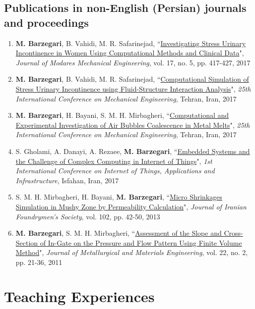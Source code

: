 \documentclass{cv}
\begin{document}
\subsection{Publications in non-English (Persian) journals and proceedings}
\begin{enumerate}
\item
\textbf{M. Barzegari}, B. Vahidi, M. R. Safarinejad, ``\href{http://mme-old.modares.ac.ir/article_16771_en.html}{Investigating Stress Urinary Incontinence in Women Using Computational Methods and Clinical Data}", \textit{Journal of Modares Mechanical Engineering}, vol. 17, no. 5, pp. 417-427, 2017 %
\item
\textbf{M. Barzegari}, B. Vahidi, M. R. Safarinejad, ``\href{https://www.civilica.com/Paper-ISME25-ISME25_342.html}{Computational Simulation of Stress Urinary Incontinence using Fluid-Structure Interaction Analysis}", \textit{25th International Conference on Mechanical Engineering}, Tehran, Iran, 2017
\item
\textbf{M. Barzegari}, H. Bayani, S. M. H. Mirbagheri, ``\href{https://www.civilica.com/Paper-ISME25-ISME25_710.html}{Computational and Experimental Investigation of Air Bubbles Coalescence in Metal Melts}", \textit{25th International Conference on Mechanical Engineering}, Tehran, Iran, 2017
\item
S. Gholami, A. Danayi, A. Rezaee, \textbf{M. Barzegari}, ``\href{https://civilica.com/doc/656407/}{Embedded Systems and the Challenge of Complex Computing in Internet of Things}", \textit{1st International Conference on Internet of Things, Applications and Infrastructure}, Isfahan, Iran, 2017
\item
S. M. H. Mirbagheri, H. Bayani, \textbf{M. Barzegari}, ``\href{https://1drv.ms/b/s!Av7P45pSaDtYgUnsN3LHLbiNHomt}{Micro Shrinkages Simulation in Mushy Zone by Permeability Calculation}", \textit{Journal of Iranian Foundrymen's Society}, vol. 102, pp. 42-50, 2013 %
\item
\textbf{M. Barzegari}, S. M. H. Mirbagheri, ``\href{http://jmme.um.ac.ir/index.php/metallurgical/article/view/10905}{Assessment of the Slope and Cross-Section of In-Gate on the Pressure and Flow Pattern Using Finite Volume Method}", \textit{Journal of Metallurgical and Materials Engineering}, vol. 22, no. 2, pp. 21-36, 2011 %
\end{enumerate}



\section{Teaching Experiences}
\end{document}

